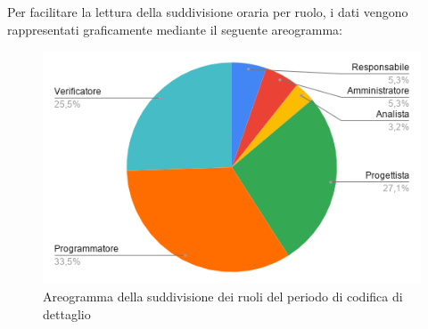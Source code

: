 \documentclass[../piano-di-progetto.tex]{subfiles}
\begin{document}
  Per facilitare la lettura della suddivisione oraria per ruolo, i dati vengono rappresentati graficamente mediante il seguente areogramma:
  \begin{figure}[H]
    \centering
    \includegraphics[width=12cm]{img/ruoli-codifica.png}
    \caption{Areogramma della suddivisione dei ruoli del periodo di codifica di dettaglio}
    \label{fig:ore-ruolo-codifica}
  \end{figure}
\end{document}
